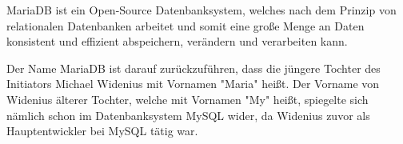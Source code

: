 
MariaDB ist ein Open-Source Datenbanksystem, welches nach dem Prinzip von relationalen Datenbanken arbeitet und somit eine große Menge an Daten konsistent und effizient abspeichern, verändern und verarbeiten kann.

Der Name MariaDB ist darauf zurückzuführen, dass die jüngere Tochter des Initiators Michael Widenius mit Vornamen "Maria" heißt. Der Vorname von Widenius älterer Tochter, welche mit Vornamen "My" heißt, spiegelte sich nämlich schon im Datenbanksystem MySQL wider, da Widenius zuvor als Hauptentwickler bei MySQL tätig war. \cite{MariaWiki}